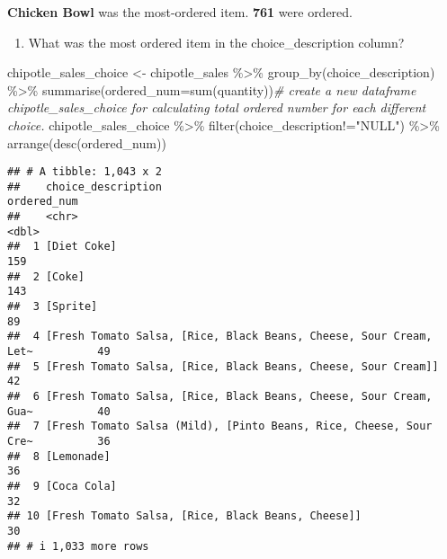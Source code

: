 \documentclass[
]{article}
\newenvironment{Shaded}{\begin{snugshade}}{\end{snugshade}}
\newcommand{\AttributeTok}[1]{\textcolor[rgb]{0.77,0.63,0.00}{#1}}
\newcommand{\CommentTok}[1]{\textcolor[rgb]{0.56,0.35,0.01}{\textit{#1}}}
\newcommand{\FunctionTok}[1]{\textcolor[rgb]{0.00,0.00,0.00}{#1}}
\newcommand{\NormalTok}[1]{#1}
\newcommand{\OtherTok}[1]{\textcolor[rgb]{0.56,0.35,0.01}{#1}}
\newcommand{\SpecialCharTok}[1]{\textcolor[rgb]{0.00,0.00,0.00}{#1}}
\newcommand{\StringTok}[1]{\textcolor[rgb]{0.31,0.60,0.02}{#1}}
\providecommand{\tightlist}{%
  \setlength{\itemsep}{0pt}\setlength{\parskip}{0pt}}
\begin{document}
\textbf{Chicken Bowl} was the most-ordered item. \textbf{761} were
ordered.

\begin{enumerate}
\def\labelenumi{\arabic{enumi}.}
\setcounter{enumi}{2}
\tightlist
\item
  What was the most ordered item in the choice\_description column?
\end{enumerate}

\begin{Shaded}
\begin{Highlighting}[]
\NormalTok{chipotle\_sales\_choice }\OtherTok{\textless{}{-}}\NormalTok{ chipotle\_sales }\SpecialCharTok{\%\textgreater{}\%} \FunctionTok{group\_by}\NormalTok{(choice\_description) }\SpecialCharTok{\%\textgreater{}\%} \FunctionTok{summarise}\NormalTok{(}\AttributeTok{ordered\_num=}\FunctionTok{sum}\NormalTok{(quantity))}\CommentTok{\# create a new dataframe chipotle\_sales\_choice for calculating total ordered number for each different choice.}
\NormalTok{chipotle\_sales\_choice }\SpecialCharTok{\%\textgreater{}\%} \FunctionTok{filter}\NormalTok{(choice\_description}\SpecialCharTok{!=}\StringTok{"NULL"}\NormalTok{) }\SpecialCharTok{\%\textgreater{}\%} \FunctionTok{arrange}\NormalTok{(}\FunctionTok{desc}\NormalTok{(ordered\_num))}
\end{Highlighting}
\end{Shaded}

\begin{verbatim}
## # A tibble: 1,043 x 2
##    choice_description                                                ordered_num
##    <chr>                                                                   <dbl>
##  1 [Diet Coke]                                                               159
##  2 [Coke]                                                                    143
##  3 [Sprite]                                                                   89
##  4 [Fresh Tomato Salsa, [Rice, Black Beans, Cheese, Sour Cream, Let~          49
##  5 [Fresh Tomato Salsa, [Rice, Black Beans, Cheese, Sour Cream]]              42
##  6 [Fresh Tomato Salsa, [Rice, Black Beans, Cheese, Sour Cream, Gua~          40
##  7 [Fresh Tomato Salsa (Mild), [Pinto Beans, Rice, Cheese, Sour Cre~          36
##  8 [Lemonade]                                                                 36
##  9 [Coca Cola]                                                                32
## 10 [Fresh Tomato Salsa, [Rice, Black Beans, Cheese]]                          30
## # i 1,033 more rows
\end{verbatim}
\end{document}
